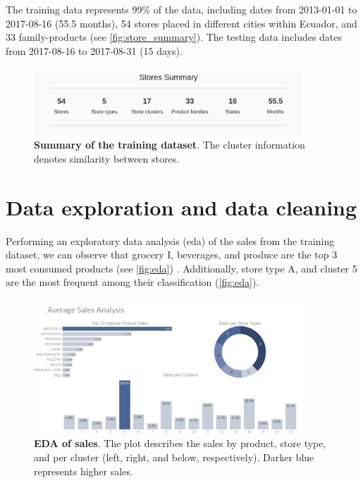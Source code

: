 The training data represents 99\% of the data, including dates from 2013-01-01 to 2017-08-16 (55.5 months), 54 stores placed in different cities within Ecuador, and 33 family-products (see \autoref{fig:store_summary}). The testing data includes dates from 2017-08-16 to 2017-08-31 (15 days).

\begin{figure}[!htb]
  \centering
  \includegraphics[width=0.9\textwidth]{plots/data_description/stores_summary.png}
  \caption[Summary of the training dataset]{\textbf{Summary of the training dataset}. The cluster information denotes similarity between stores.}
  \label{fig:store_summary}
\end{figure}

\section[Data exploration and data cleaning]{Data exploration and data cleaning}
\label{sec:eda}

Performing an exploratory data analysis (eda) of the sales from the training dataset, we can observe that grocery I, beverages, and produce are the top 3 most consumed products (see \autoref{fig:eda}) . Additionally, store type A, and cluster 5 are the most frequent among their classification (\autoref{fig:eda}).

\begin{figure}[!htb]
  \centering
  \includegraphics[width=0.9\textwidth]{plots/eda/sale_analysis.png}
  \caption[EDA of sales]{\textbf{EDA of sales}. The plot describes the sales by product, store type, and per cluster (left, right, and below, respectively). Darker blue represents higher sales. }
  \label{fig:eda}
\end{figure}


